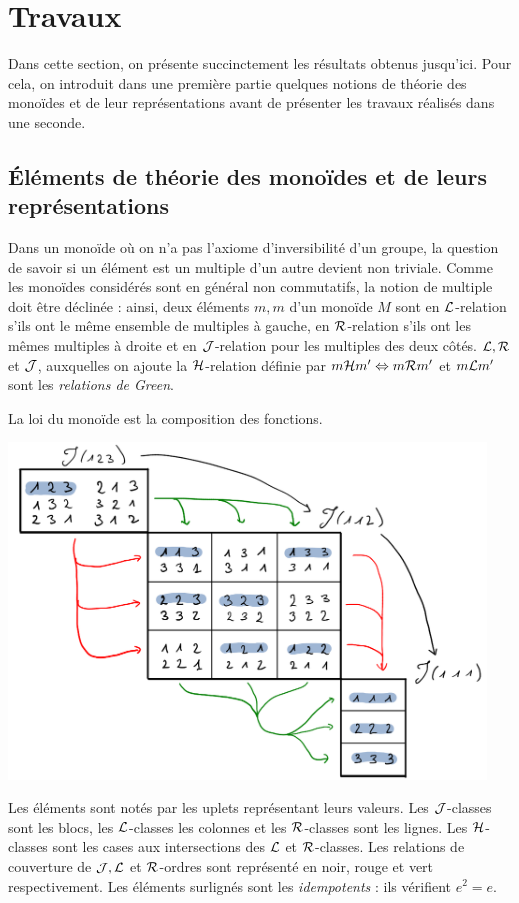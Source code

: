 \documentclass{article}
\begin{document}
	\section*{Travaux}\label{sec:travaux}
	
	Dans cette section, on présente succinctement les résultats obtenus jusqu'ici. Pour cela, on introduit dans une première partie quelques notions de théorie des monoïdes et de leur représentations avant de présenter les travaux réalisés dans une seconde.
	
	\subsection*{\'Eléments de théorie des monoïdes et de leurs représentations}
	
	Dans un monoïde où on n'a pas l'axiome d'inversibilité d'un groupe, la question de savoir si un élément est un multiple d'un autre devient non triviale. Comme les monoïdes considérés sont en général non commutatifs, la notion de multiple doit être déclinée : ainsi, deux éléments $m, m$ d'un monoïde $M$ sont en $\mathcal{L}$-relation s'ils ont le même ensemble de multiples à gauche, en $\mathcal{R}$-relation s'ils ont les mêmes multiples à droite et en $\mathcal{J}$-relation pour les multiples des deux côtés. $\mathcal{L}, \mathcal{R}$ et $\mathcal{J}$, auxquelles on ajoute la $\mathcal{H}$-relation définie par $m\mathcal{H} m' \Leftrightarrow m\mathcal{R} m'$ et $m\mathcal{L} m'$ sont les \emph{relations de Green}.
	
	\begin{lined}
		\begin{ex}
			La loi du monoïde est la composition des fonctions.
		
			{\centering
			\includegraphics[width=0.95\textwidth]{./ordres.png}}
			
			Les éléments sont notés par les uplets représentant leurs valeurs. Les $\mathcal{J}$-classes sont les blocs, les $\mathcal{L}$-classes les colonnes et les $\mathcal{R}$-classes sont les lignes. Les $\mathcal{H}$-classes sont les cases aux intersections des $\mathcal{L}$ et $\mathcal{R}$-classes. Les relations de couverture de $\mathcal{J}, \mathcal{L}$ et $\mathcal{R}$-ordres sont représenté en noir, rouge et vert respectivement. Les éléments surlignés sont les \emph{idempotents} : ils vérifient $e^2 = e$.
		\end{ex}
	\end{lined}
	
\end{document}
